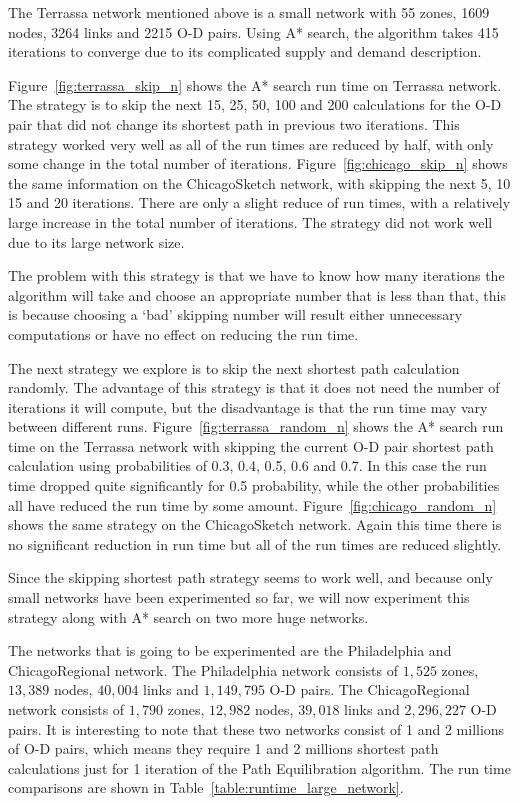 The Terrassa network mentioned above is a small network with 55 zones, 1609 nodes, 3264 links and 2215 O-D pairs.
Using A* search,
the algorithm takes 415 iterations to converge due to its complicated supply and demand description.

Figure~\ref{fig:terrassa_skip_n} shows the A* search run time on Terrassa network.
The strategy is to skip the next 15, 25, 50, 100 and 200 calculations for the O-D pair that did not change its shortest path in previous two iterations.
This strategy worked very well as all of the run times are reduced by half,
with only some change in the total number of iterations.
Figure~\ref{fig:chicago_skip_n} shows the same information on the ChicagoSketch network, with skipping the next 5, 10 15 and 20 iterations.
There are only a slight reduce of run times,
with a relatively large increase in the total number of iterations.
The strategy did not work well due to its large network size.

The problem with this strategy is that we have to know how many iterations the algorithm will take and choose an appropriate number that is less than that,
this is because choosing a `bad' skipping number will result either unnecessary computations or have no effect on reducing the run time.

The next strategy we explore is to skip the next shortest path calculation randomly.
The advantage of this strategy is that it does not need the number of iterations it will compute,
but the disadvantage is that the run time may vary between different runs.
Figure~\ref{fig:terrassa_random_n} shows the A* search run time on the Terrassa network with skipping the current O-D pair shortest path calculation using probabilities of 0.3, 0.4, 0.5, 0.6 and 0.7.
In this case the run time dropped quite significantly for 0.5 probability,
while the other probabilities all have reduced the run time by some amount.
Figure~\ref{fig:chicago_random_n} shows the same strategy on the ChicagoSketch network.
Again this time there is no significant reduction in run time but all of the run times are reduced slightly.

Since the skipping shortest path strategy seems to work well,
and because only small networks have been experimented so far,
we will now experiment this strategy along with A* search on two more huge networks.

The networks that is going to be experimented are the Philadelphia and ChicagoRegional network. 
The Philadelphia network consists of $1,525$ zones, $13,389$ nodes, $40,004$ links and $1,149,795$ O-D pairs.
The ChicagoRegional network consists of $1,790$ zones, $12,982$ nodes, $39,018$ links and $2,296,227$ O-D pairs.
It is interesting to note that these two networks consist of 1 and 2 millions of O-D pairs, which means they require 1 and 2 millions shortest path calculations just for 1 iteration of the Path Equilibration algorithm.
The run time comparisons are shown in Table~\ref{table:runtime_large_network}.

